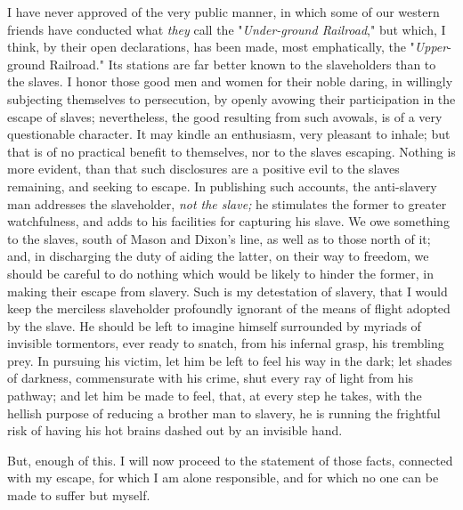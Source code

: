 I have never approved of the very public manner, in which some of our
western friends have conducted what \emph{they} call the
"\emph{Under-ground Railroad}," but which, I think, by their open
declarations, has been made, most emphatically, the "\emph{Upper}-ground
Railroad." Its stations are far better known to the slaveholders than to
the slaves. I honor those good men and women for their noble daring, in
willingly {}subjecting themselves to persecution, by openly avowing
their participation in the escape of slaves; nevertheless, the good
resulting from such avowals, is of a very questionable character. It may
kindle an enthusiasm, very pleasant to inhale; but that is of no
practical benefit to themselves, nor to the slaves escaping. Nothing is
more evident, than that such disclosures are a positive evil to the
slaves remaining, and seeking to escape. In publishing such accounts,
the anti-slavery man addresses the slaveholder, \emph{not the slave;} he
stimulates the former to greater watchfulness, and adds to his
facilities for capturing his slave. We owe something to the slaves,
south of Mason and Dixon's line, as well as to those north of it; and,
in discharging the duty of aiding the latter, on their way to freedom,
we should be careful to do nothing which would be likely to hinder the
former, in making their escape from slavery. Such is my detestation of
slavery, that I would keep the merciless slaveholder profoundly ignorant
of the means of flight adopted by the slave. He should be left to
imagine himself surrounded by myriads of invisible tormentors, ever
ready to snatch, from his infernal grasp, his trembling prey. In
pursuing his victim, let him be left to feel his way in the dark; let
shades of darkness, commensurate with his crime, shut every ray of light
from his pathway; and let him be made to feel, that, at every step he
takes, with the hellish purpose of reducing a brother man to slavery, he
is running the frightful risk of having his hot brains dashed out by an
invisible hand.

But, enough of this. I will now proceed to the {}statement of those
facts, connected with my escape, for which I am alone responsible, and
for which no one can be made to suffer but myself.

